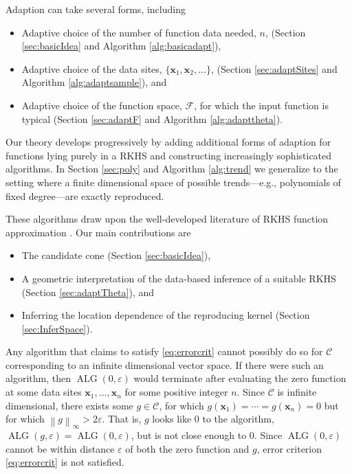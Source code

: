 \documentclass[]{mcom-l}
\theoremstyle{theorem}
\theoremstyle{remark}
\DeclareMathOperator{\ALG}{ALG}
\newcommand{\bx}{{\boldsymbol{x}}}
\newcommand{\cc}{\mathcal{C}}
\newcommand{\calf}{{\mathcal{F}}}
\newcommand{\norm}[2][{}]{\ensuremath{\left \lVert #2 \right \rVert}_{#1}}
\begin{document}
Adaption can take several forms, including
\begin{itemize}
    \item Adaptive choice of the number of function data needed, $n$, (Section \ref{sec:basicIdea} and Algorithm \ref{alg:basicadapt}),
    \item Adaptive choice of the data sites, $\{\bx_1, \bx_2, \ldots\}$,  (Section \ref{sec:adaptSites} and Algorithm \ref{alg:adaptsample}), and
    \item Adaptive choice of the function space, $\calf$, for which the input function is typical  (Section \ref{sec:adaptF} and Algorithm \ref{alg:adapttheta}).
\end{itemize}
Our theory develops progressively by adding additional forms of adaption for functions lying purely in a RKHS and constructing increasingly sophisticated algorithms.  In Section \ref{sec:poly} and Algorithm \ref{alg:trend} we generalize to the setting where a finite dimensional space of possible trends---e.g., polynomials of fixed degree---are exactly reproduced.

These algorithms draw upon the well-developed literature of RKHS function approximation \cite{Buh03a,Fas07a,FasMcC15a,ForFly15a,ForEtal09,RasWil06a,SchWen06a,Wah85a,Wen05a}.  Our main contributions are 
\begin{itemize}
	\item The candidate cone (Section \ref{sec:basicIdea}),
	\item A geometric interpretation of the data-based inference of a suitable RKHS (Section  \ref{sec:adaptTheta}), and
	\item Inferring the location dependence of the reproducing kernel (Section \ref{sec:InferSpace}).
\end{itemize}

Any algorithm that claims to satisfy \eqref{eq:errorcrit} cannot possibly do so for $\cc$ corresponding to an infinite dimensional vector space.  If there were such an algorithm, then $\ALG(0,\varepsilon)$ would terminate after evaluating the zero function at some data sites $\bx_1, \ldots, \bx_n$ for some positive integer $n$.  Since $\cc$ is infinite dimensional, there exists some $g \in \cc$, for which $g(\bx_1) = \cdots = g(\bx_n) = 0$ but for which $\norm[\infty]{g} > 2 \varepsilon$.  That is, $g$ looks like  $0$ to the algorithm, $\ALG(g,\varepsilon) = \ALG(0,\varepsilon)$, but is not close enough to $0$.   Since $\ALG(0,\varepsilon)$ cannot be within distance $\varepsilon$ of both the zero function and $g$, error criterion \eqref{eq:errorcrit} is not satisfied.
\end{document}
